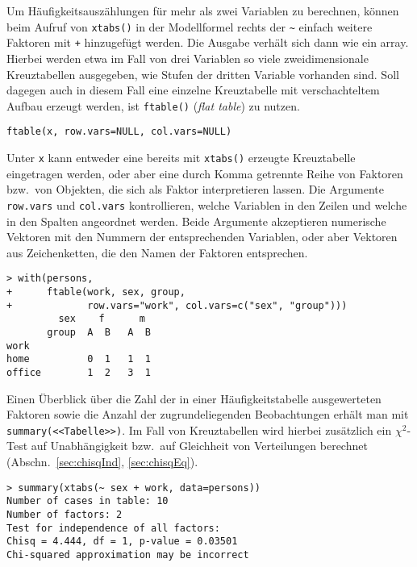 Um Häufigkeitsauszählungen für mehr als zwei Variablen zu berechnen, können beim Aufruf von \lstinline!xtabs()! in der Modellformel rechts der \lstinline!~! einfach weitere Faktoren mit \lstinline!+! hinzugefügt werden. Die Ausgabe verhält sich dann wie ein array. Hierbei werden etwa im Fall von drei Variablen so viele zweidimensionale Kreuztabellen ausgegeben, wie Stufen der dritten Variable vorhanden sind. Soll dagegen auch in diesem Fall eine einzelne Kreuztabelle mit verschachteltem Aufbau erzeugt werden, ist \lstinline!ftable()! (\emph{flat table}) zu nutzen.
\begin{lstlisting}
ftable(x, row.vars=NULL, col.vars=NULL)
\end{lstlisting}

Unter \lstinline!x! kann entweder eine bereits mit \lstinline!xtabs()! erzeugte Kreuztabelle eingetragen werden, oder aber eine durch Komma getrennte Reihe von Faktoren bzw.\ von Objekten, die sich als Faktor interpretieren lassen. Die Argumente \lstinline!row.vars! und \lstinline!col.vars! kontrollieren, welche Variablen in den Zeilen und welche in den Spalten angeordnet werden. Beide Argumente akzeptieren numerische Vektoren mit den Nummern der entsprechenden Variablen, oder aber Vektoren aus Zeichenketten, die den Namen der Faktoren entsprechen.
\begin{lstlisting}
> with(persons,
+      ftable(work, sex, group,
+             row.vars="work", col.vars=c("sex", "group")))
         sex    f      m
       group  A  B   A  B
work
home          0  1   1  1
office        1  2   3  1
\end{lstlisting}

Einen Überblick über die Zahl der in einer Häufigkeitstabelle ausgewerteten Faktoren sowie die Anzahl der zugrundeliegenden Beobachtungen erhält man mit \lstinline!summary(<<Tabelle>>)!. Im Fall von Kreuztabellen wird hierbei zusätzlich ein $\chi^{2}$-Test auf Unabhängigkeit bzw.\ auf Gleichheit von Verteilungen berechnet (Abschn.\ \ref{sec:chisqInd}, \ref{sec:chisqEq}).
\begin{lstlisting}
> summary(xtabs(~ sex + work, data=persons))
Number of cases in table: 10
Number of factors: 2
Test for independence of all factors:
Chisq = 4.444, df = 1, p-value = 0.03501
Chi-squared approximation may be incorrect
\end{lstlisting}

